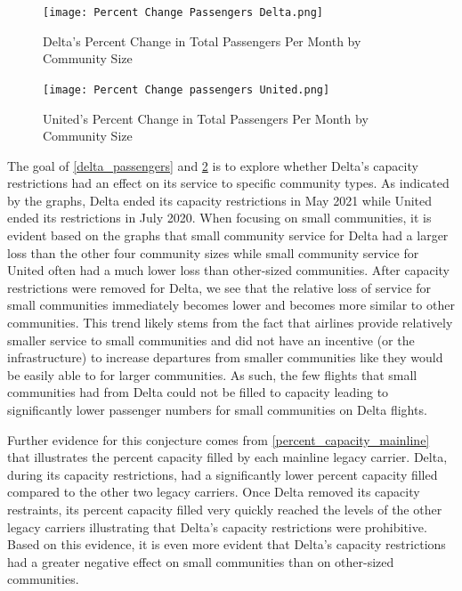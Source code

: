 \documentclass[11pt]{article}
\begin{document}
\begin{figure}[htbp!]
  \centerline{\texttt{[image: Percent Change Passengers Delta.png]}}
  \caption{Delta's Percent Change in Total Passengers Per Month by Community Size}
  \label{Delta's Percent Change in Passengers}
\end{figure}

\begin{figure}[htbp!]
  \centerline{\texttt{[image: Percent Change passengers United.png]}}
  \caption{United's Percent Change in Total Passengers Per Month by Community Size}
  \label{United's Percent Change in Passengers}
\end{figure}

The goal of \ref{delta_passengers} and \ref{United's Percent Change in Passengers} is to explore whether Delta’s capacity restrictions had an effect on its service to specific community types. As indicated by the graphs, Delta ended its capacity restrictions in May 2021 while United ended its restrictions in July 2020. When focusing on small communities, it is evident based on the graphs that small community service for Delta had a larger loss than the other four community sizes while small community service for United often had a much lower loss than other-sized communities. After capacity restrictions were removed for Delta, we see that the relative loss of service for small communities immediately becomes lower and becomes more similar to other communities. This trend likely stems from the fact that airlines provide relatively smaller service to small communities and did not have an incentive (or the infrastructure) to increase departures from smaller communities like they would be easily able to for larger communities. As such, the few flights that small communities had from Delta could not be filled to capacity leading to significantly lower passenger numbers for small communities on Delta flights.\newline

\-\hspace{0.5cm} Further evidence for this conjecture comes from \ref{percent_capacity_mainline} that illustrates the percent capacity filled by each mainline legacy carrier. Delta, during its capacity restrictions, had a significantly lower percent capacity filled compared to the other two legacy carriers. Once Delta removed its capacity restraints, its percent capacity filled very quickly reached the levels of the other legacy carriers illustrating that Delta’s capacity restrictions were prohibitive. Based on this evidence, it is even more evident that Delta’s capacity restrictions had a greater negative effect on small communities than on other-sized communities.\newline
\end{document}
